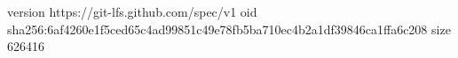 version https://git-lfs.github.com/spec/v1
oid sha256:6af4260e1f5ced65c4ad99851c49e78fb5ba710ec4b2a1df39846ca1ffa6c208
size 626416
